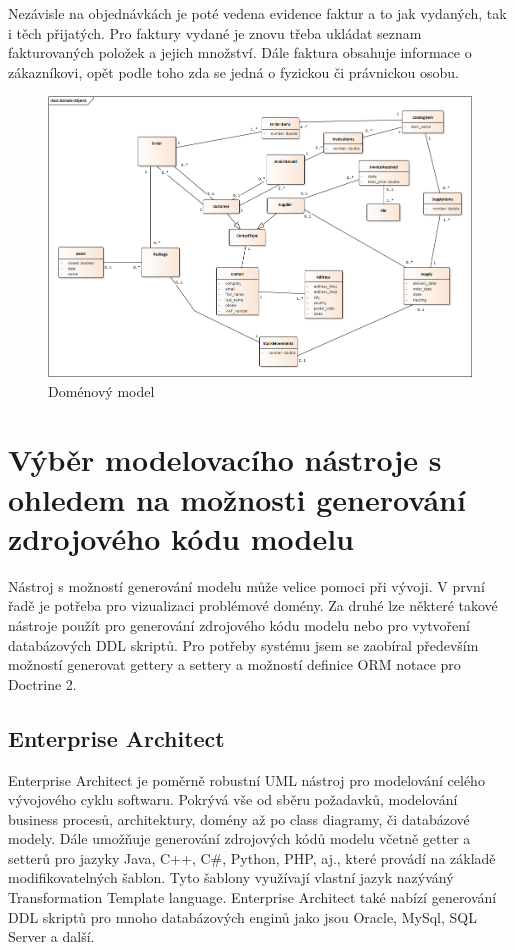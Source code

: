 \documentclass[thesis=B,czech]{FITthesis}[2012/06/26]
\begin{document}
	Nezávisle na objednávkách je poté vedena evidence faktur a to jak vydaných, tak i těch přijatých. Pro faktury vydané je znovu třeba ukládat seznam fakturovaných položek a jejich množství. Dále faktura obsahuje informace o zákazníkovi, opět podle toho zda se jedná o fyzickou či právnickou osobu. 
	
\begin{figure}
	\includegraphics[height=\textwidth, angle=90]{domain_model.png}
	\caption{Doménový model}\label{domain_model}
\end{figure}

\section{Výběr modelovacího nástroje s ohledem na možnosti generování zdrojového kódu modelu}
	Nástroj s možností generování modelu může velice pomoci při vývoji. V první řadě je potřeba pro vizualizaci problémové domény. Za druhé lze některé takové nástroje použít pro generování zdrojového kódu modelu nebo pro vytvoření databázových DDL skriptů. Pro potřeby systému jsem se zaobíral především možností generovat gettery a settery a možností definice ORM notace pro Doctrine 2.

\subsection{Enterprise Architect}
	Enterprise Architect je poměrně robustní UML nástroj pro modelování celého vývojového cyklu softwaru. Pokrývá vše od sběru požadavků, modelování business procesů, architektury, domény až po class diagramy, či databázové modely. Dále umožňuje generování zdrojových kódů modelu včetně getter a setterů pro jazyky Java, C++, C\#, Python, PHP, aj., které provádí na základě modifikovatelných šablon. Tyto šablony využívají vlastní jazyk nazýváný Transformation Template language. Enterprise Architect také nabízí generování DDL skriptů pro mnoho databázových enginů jako jsou Oracle, MySql, SQL Server a další.
\end{document}
